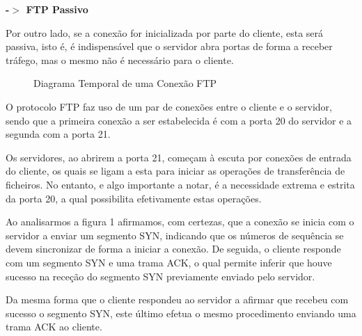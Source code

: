 \documentclass[11pt]{article}
\begin{document}
\vspace{0.5cm}

\par \textbf{-$>$ FTP Passivo}

\vspace{0.25cm}

Por outro lado, se a conexão for inicializada por parte do cliente, esta será passiva, isto é, é indispensável que o servidor abra portas de forma a receber tráfego, mas o mesmo não é necessário para o cliente.

\begin{figure}[hbt!]
    \centering
    \caption{Diagrama Temporal de uma Conexão FTP}
\end{figure}

O protocolo FTP faz uso de um par de conexões entre o cliente e o servidor, sendo que a primeira conexão a ser estabelecida é com a porta 20 do servidor e a segunda com a porta 21.

Os servidores, ao abrirem a porta 21, começam à escuta por conexões de entrada do cliente, os quais se ligam a esta para iniciar as operações de transferência de ficheiros. No entanto, e algo importante a notar, é a necessidade extrema e estrita da porta 20, a qual possibilita efetivamente estas operações.

\clearpage
Ao analisarmos a figura 1 afirmamos, com certezas, que a conexão se inicia com o servidor a enviar um segmento SYN, indicando que os números de sequência se devem sincronizar de forma a iniciar a conexão. De seguida, o cliente responde com um segmento SYN e uma trama ACK, o qual permite inferir que houve sucesso na receção do segmento SYN previamente enviado pelo servidor.

Da mesma forma que o cliente respondeu ao servidor a afirmar que recebeu com sucesso o segmento SYN, este último efetua o mesmo procedimento enviando uma trama ACK ao cliente.
\end{document}
